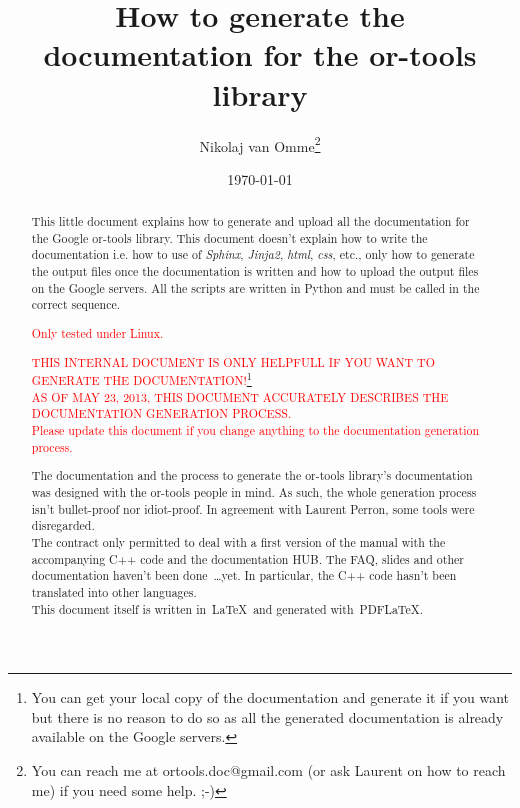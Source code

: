 \documentclass[a4paper,10pt]{article}
\title{How to generate the documentation for the or-tools library}
\author{Nikolaj van Omme\footnote{You can reach me at ortools.doc@gmail.com (or ask Laurent on how to reach me) if you need some help. ;-) }}
\date{\today}
\begin{document}
\maketitle

\begin{abstract}
This little document explains how to generate and upload all the documentation for the Google or-tools library. This document doesn't explain how to write the documentation i.e. how to use of \emph{Sphinx}, \emph{Jinja2}, \emph{html}, \emph{css}, etc., only how to generate the output files once
the documentation is written and how to upload the output files on the Google servers. All the scripts are written in Python and must be called in the correct sequence.\\
\begin{center}\textcolor{red}{Only tested under Linux.}\end{center}
\begin{center}\textcolor{red}{THIS INTERNAL DOCUMENT IS ONLY HELPFULL IF YOU WANT TO GENERATE THE DOCUMENTATION!}\footnote{You can get your local copy of the documentation and generate it if you want but there is no reason to do so as all the generated documentation is already available on the Google servers.}\\
\vspace{0.5cm}
\textcolor{red}{AS OF MAY 23, 2013, THIS DOCUMENT ACCURATELY DESCRIBES THE DOCUMENTATION GENERATION PROCESS.}\\
\vspace{0.2cm}
\textcolor{red}{Please update this document if you change anything to the documentation generation process.}
\end{center}

The documentation and the process to generate the or-tools library's documentation was designed with the or-tools people in mind. As such, the whole generation process isn't bullet-proof nor idiot-proof. In agreement with Laurent Perron, some tools were disregarded.\\

The contract only permitted to deal with a first version of the manual with the accompanying C++ code and the documentation HUB. The FAQ, slides and other documentation haven't been done~\ldots yet. In particular, the C++ code hasn't been translated into other languages.\\

This document itself is written in~\LaTeX\ and generated with~PDF\LaTeX.

\end{abstract}
\end{document}
